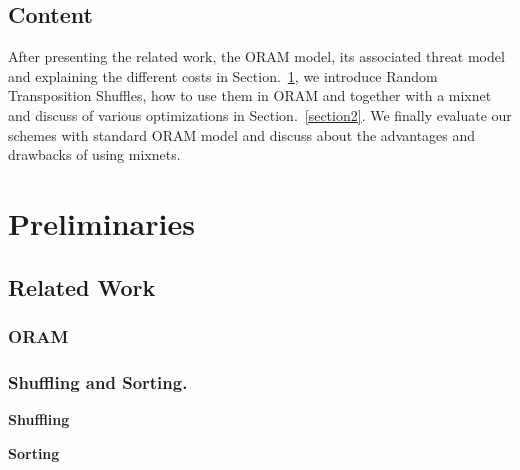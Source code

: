 \documentclass[conference]{IEEEtran}
\newcommand{\raphael}[1]{\textcolor{blue}{Raphael: #1}}
\begin{document}
\subsection{Content}
After presenting the related work, the ORAM model, its associated threat model and explaining the different costs in Section.~\ref{section1}, we introduce Random Transposition Shuffles, how to use them in ORAM and together with a mixnet and discuss of various optimizations in Section.~\ref{section2}.
We finally evaluate our schemes with standard ORAM model and discuss about the advantages and drawbacks of using mixnets.


\section{Preliminaries}
\label{section1}

\subsection{Related Work}
\subsubsection{ORAM}

\subsubsection{Shuffling and Sorting.}

\noindent\textbf{Shuffling}
\iffalse
\raphael{Melbourne Shuffle intro for inspiration}
A shufﬂe is an algorithm for rearranging an array to achieve a random permutation of its elements.
Early shufﬂe methods were motivated by the problem of shufﬂing a deck of cards.
Classic card shufﬂe methods(e.g.,Knuth(orFisher-Yates)[17],the rifﬂe shufﬂe[2],Thorp shufﬂe[24]) are not data-oblivious, however, as anyone observing card swaps or rifﬂes (interleaving two subdecks) of such methods can learn the ﬁnal output permutation.
In ICALP 2012, Goodrich and Mitzenmacher [10] showed that one can,in fact,shufﬂe a deck of n cards and guarantee that an observer cannot ﬁnd a particular card in the output permutation with probability better than O(1/n).
However, this algorithm is not an effective shufﬂe for our purposes,since the output permutations produced by the algorithm are not allequally likely and there may be dependencies between large groups of cards that could be leaked.
Most other existing efﬁcient data-oblivious shufﬂing methods assign random values to the elements of the array and use a dataoblivious algorithm to sort the array according to these values.
\fi
\noindent\textbf{Sorting} \\
\end{document}
